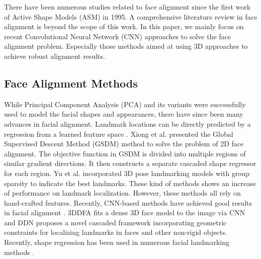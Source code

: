 \documentclass[10pt,twocolumn,letterpaper]{article}
\begin{document}
There have been numerous studies related to face alignment since the first work of Active Shape Models (ASM) \cite{cootes1995active} in 1995. A comprehensive literature review in face alignment is beyond the scope of this work.
In this paper, we mainly focus on
recent Convolutional Neural Network (CNN) approaches to solve the face alignment problem. Especially those methods aimed at using 3D approaches to achieve robust alignment results.

\subsection{Face Alignment Methods}

While Principal Component Analysis (PCA) and its variants \cite{cootes1995active, cootes2001active, cristinacce2008automatic} were successfully used to model the facial shapes and appearances, there have since been many advances in facial alignment.  Landmark locations can be directly predicted by a regression from a learned feature space \cite{cao2014face, dantone2012real, xiong2013supervised}. Xiong et al. \cite{xiong2015global} presented the Global Supervised Descent Method (GSDM) method to solve the problem of 2D face alignment. The objective function in GSDM is divided into multiple regions of similar gradient directions. It then constructs a separate cascaded shape regressor for each region. Yu et al. \cite{yu2013pose} incorporated 3D pose landmarking models with group sparsity to indicate the best landmarks. These kind of methods shows an increase of performance on landmark localization. However, these methods all rely on hand-crafted features. 
Recently, CNN-based methods have achieved good results in facial alignment \cite{Zhu16falp, yu2016deep}. 3DDFA \cite{Zhu16falp} fits a dense 3D face model to the image via CNN and DDN \cite{yu2016deep} proposes a novel cascaded framework incorporating geometric constraints for localizing landmarks in faces and other non-rigid objects. Recently, shape regression has been used in numerous facial landmarking methods \cite{Tzimiropoulos2015, RenICCV2014, Artizzu2013}. 

\end{document}
